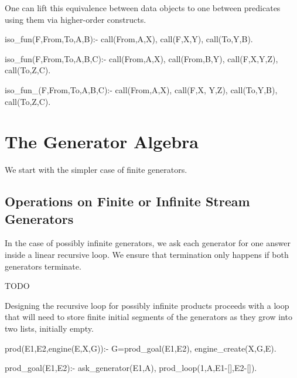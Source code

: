 \documentclass{new_tlp}
\begin{document}
One can lift this equivalence between data objects to one between predicates using them via higher-order constructs.

\begin{code}

%
iso_fun(F,From,To,A,B):-
  call(From,A,X),
  call(F,X,Y),
  call(To,Y,B).

%
iso_fun(F,From,To,A,B,C):- %
  call(From,A,X),
  call(From,B,Y),
  call(F,X,Y,Z),
  call(To,Z,C).

%
iso_fun_(F,From,To,A,B,C):- 
  call(From,A,X),
  call(F,X, Y,Z), %
  call(To,Y,B),
  call(To,Z,C).
\end{code}

\section{The Generator Algebra}
We start with the simpler case of finite generators.
 



\subsection{Operations on Finite or  Infinite Stream Generators}

In the case of possibly infinite generators, we  ask each generator for one answer inside a linear recursive loop. We ensure that termination only happens if both generators terminate.
\begin{code}
TODO
\end{code}

Designing the recursive loop for possibly infinite products
proceeds with a loop that will need to store finite initial 
segments of the generators as they grow into two lists, initially
empty.
\begin{code}
prod(E1,E2,engine(E,X,G)):-
  G=prod_goal(E1,E2),
  engine_create(X,G,E).

prod_goal(E1,E2):-
  ask_generator(E1,A),
  prod_loop(1,A,E1-[],E2-[]).
\end{code}
\end{document}
